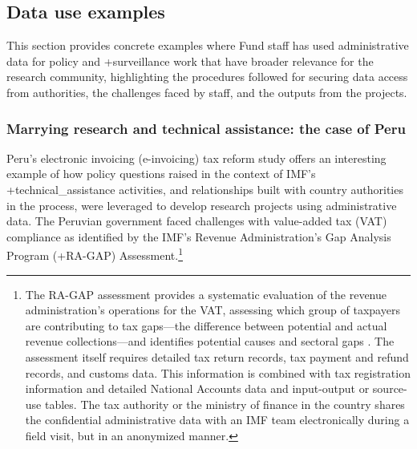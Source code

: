 \documentclass[
]{book}
\begin{document}
\hypertarget{data-use-examples-8}{%
\subsection{Data use examples}\label{data-use-examples-8}}

This section provides concrete examples where Fund staff has used administrative data for policy and +surveillance\textbar{} work that have broader relevance for the research community, highlighting the procedures followed for securing data access from authorities, the challenges faced by staff, and the outputs from the projects.

\hypertarget{marrying-research-and-technical-assistance-the-case-of-peru}{%
\subsubsection{Marrying research and technical assistance: the case of Peru}\label{marrying-research-and-technical-assistance-the-case-of-peru}}

Peru's electronic invoicing (e-invoicing) tax reform study offers an interesting example of how policy questions raised in the context of IMF's +technical\_assistance\textbar{} activities, and relationships built with country authorities in the process, were leveraged to develop research projects using administrative data. The Peruvian government faced challenges with value-added tax (VAT) compliance as identified by the IMF's Revenue Administration's Gap Analysis Program (+RA-GAP\textbar) Assessment.\footnote{The RA-GAP assessment provides a systematic evaluation of the revenue administration's operations for the VAT, assessing which group of taxpayers are contributing to tax gaps---the difference between potential and actual revenue collections---and identifies potential causes and sectoral gaps \citep{hutton2017}. The assessment itself requires detailed tax return records, tax payment and refund records, and customs data. This information is combined with tax registration information and detailed National Accounts data and input-output or source-use tables. The tax authority or the ministry of finance in the country shares the confidential administrative data with an IMF team electronically during a field visit, but in an anonymized manner.}
\end{document}
